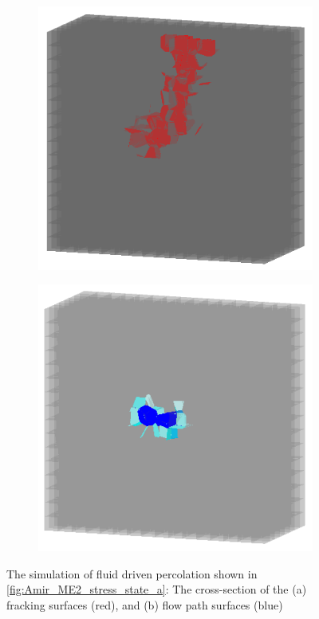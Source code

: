 \begin{figure}[!ht]
\begin{subfigure}[c]{0.48\textwidth}
\includegraphics[width=1\textwidth]{figures/Amir_ME2_LEM_a_model_Fracture.png}
\subcaption{}
\label{fig:Amir_ME2_LEM_a_model_Fracture}
\end{subfigure}
\hfill
\begin{subfigure}[c]{0.48\textwidth}
\includegraphics[width=1\textwidth]{figures/Amir_ME2_LEM_a_model_Flow.png}
\subcaption{}
\label{fig:Amir_ME2_LEM_a_model_Flow}
\end{subfigure}
\caption{ The simulation of fluid driven percolation shown in \ref{fig:Amir_ME2_stress_state_a}: The cross-section of the (a) fracking surfaces (red), and (b) flow path surfaces (blue)}
\end{figure}

